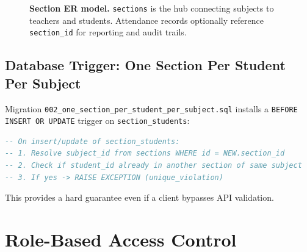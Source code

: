 \documentclass[11pt,a4paper,oneside]{report}
\begin{document}
\begin{figure}[H]
  \centering
  \caption{%
    \textbf{Section ER model.}%
    \texttt{sections} is the hub connecting subjects to teachers and students. Attendance records optionally reference \texttt{section\_id} for reporting and audit trails.
  }
  \label{fig:er}
\end{figure}

\section{Database Trigger: One Section Per Student Per Subject}

Migration \texttt{002\_one\_section\_per\_student\_per\_subject.sql} installs a \texttt{BEFORE INSERT OR UPDATE} trigger on \texttt{section\_students}:

\begin{lstlisting}[language=SQL, caption={Trigger logic (simplified)}]
-- On insert/update of section_students:
-- 1. Resolve subject_id from sections WHERE id = NEW.section_id
-- 2. Check if student_id already in another section of same subject
-- 3. If yes -> RAISE EXCEPTION (unique_violation)
\end{lstlisting}

This provides a hard guarantee even if a client bypasses API validation.

\chapter{Role-Based Access Control}
\label{ch:rbac}
\end{document}
